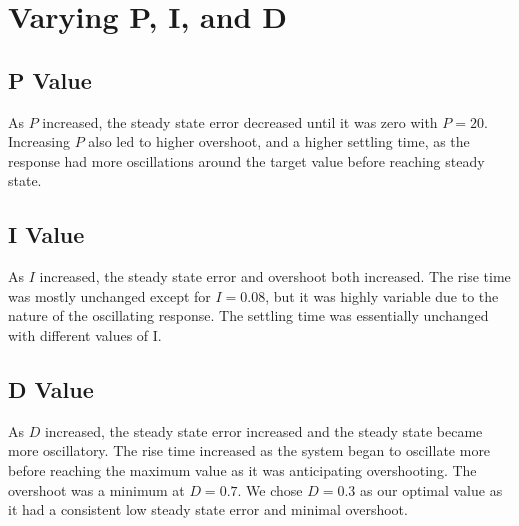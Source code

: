 \section{Varying P, I, and D}
\subsection{P Value}
As \(P\) increased, the steady state error decreased until it was zero with \(P = 20\). Increasing \(P\) also led to higher overshoot, and a higher settling time, as the response had more oscillations around the target value before reaching steady state.
\subsection{I Value}
As \(I\) increased, the steady state error and overshoot both increased. The rise time was mostly unchanged except for \(I = 0.08\), but it was highly variable due to the nature of the oscillating response. The settling time was essentially unchanged with different values of I.
\subsection{D Value}
As \(D\) increased, the steady state error increased and the steady state became more oscillatory. The rise time increased as the system began to oscillate more before reaching the maximum value as it was anticipating overshooting. The overshoot was a minimum at \(D = 0.7\). We chose \(D = 0.3\) as our optimal value as it had a consistent low steady state error and minimal overshoot.

